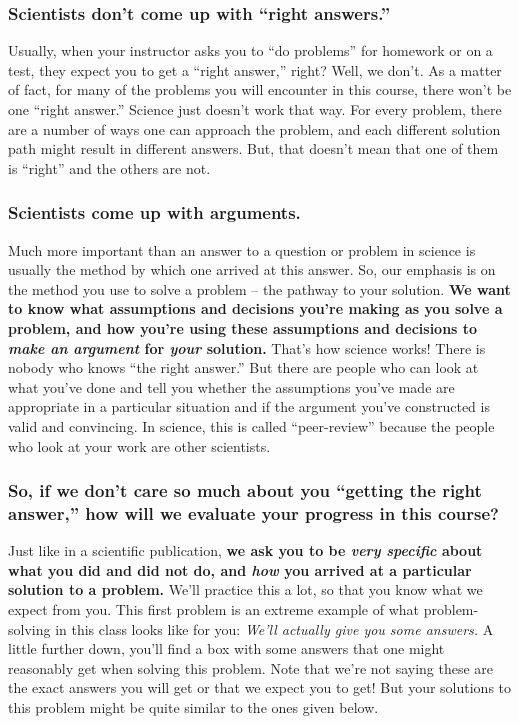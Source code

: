 \label{FNT1.1.1-1}
\subsubsection*{Scientists don't come up with ``right answers.''}

Usually, when your instructor asks you to ``do problems'' for homework or on a test, they expect you to get a ``right answer,'' right? Well, we don't. As a matter of fact, for many of the problems you will encounter in this course, there won't be one ``right answer.'' Science just doesn't work that way. For every problem, there are a number of ways one can approach the problem, and each different solution path might result in different answers. But, that doesn't mean that one of them is ``right'' and the others are not.

\subsubsection*{Scientists come up with arguments.}

Much more important than an answer to a question or problem in science is usually the method by which one arrived at this answer. So, our emphasis is on the method you use to solve a problem -- the pathway to your solution. \textbf{We want to know what assumptions and decisions you're making as you solve a problem, and how you're using these assumptions and decisions to \emph{make an argument} for \emph{your} solution.} That's how science works! There is nobody who knows ``the right answer.'' But there are people who can look at what you've done and tell you whether the assumptions you've made are appropriate in a particular situation and if the argument you've constructed is valid and convincing. In science, this is called ``peer-review'' because the people who look at your work are other scientists.

\subsubsection*{So, if we don't care so much about you ``getting the right answer,'' how will we evaluate your progress in this course?}

Just like in a scientific publication, \textbf{we ask you to be \emph{very specific} about what you did and did not do, and \emph{how} you arrived at a particular solution to a problem.} We'll practice this a lot, so that you know what we expect from you. This first problem is an extreme example of what problem-solving in this class looks like for you: \emph{We'll actually give you some answers.} A little further down, you'll find a box with some answers that one might reasonably get when solving this problem. Note that we're not saying these are the exact answers you will get or that we expect you to get! But your solutions to this problem might be quite similar to the ones given below.

